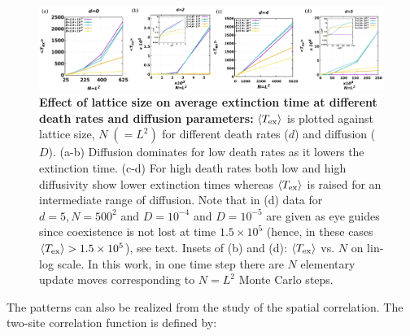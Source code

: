 \documentclass[aps, pre, twocolumn, amsmath, superscriptaddress,showkeys,showpacs]{revtex4-1}
\begin{document}
{\begin{figure}
	 \includegraphics[width= \textwidth,height=5  cm]{Diagram5.png} 
	\caption{{\bf Effect of lattice size on average extinction time at different death rates and diffusion parameters:} $\langle T_{\rm ex}\rangle$ is plotted against lattice size, $N\;(=L^2)$ for different death rates ($d$) and diffusion ($D$). (a-b) Diffusion dominates for low death rates as it lowers the extinction time. (c-d) For high death rates both low and high diffusivity show lower extinction times whereas $\langle T_{\rm ex}\rangle$ is raised for an intermediate range of diffusion.  Note that in (d) data for  $d=5, N=500^2$ 
	and $D=10^{-4}$ and $D=10^{-5}$
	are given as eye guides since coexistence is not lost at time $1.5\times 10^5$ (hence, in these cases $\langle T_{\rm ex}\rangle> 1.5\times 10^5$), see text.
	 Insets of (b) and (d): $\langle T_{\rm ex}\rangle$ vs. $N$ on lin-log scale.
	 In this work, in one time step there are $N$ elementary update moves 
	corresponding  to $N=L^2$ Monte Carlo steps.
	}
	\label{Fig-T_exvs_N}
\end{figure}
{The patterns can also be realized from the study of the spatial correlation}. The {two-site} correlation function is defined by:
}
\end{document}
